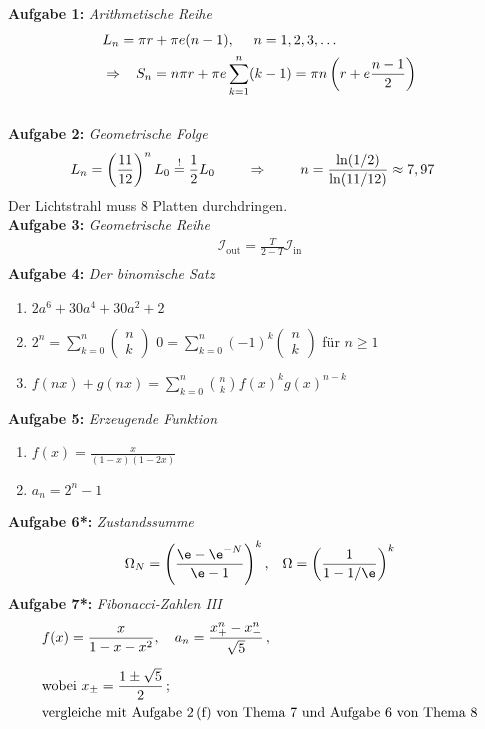 
\textbf{Aufgabe 1: } \emph{Arithmetische Reihe}
\begin{align*}
&L_n=\pi r+\pi e(n-1),\ \ \ \ n=1,2,3,\dots \\
&\Rightarrow\hspace{0.3cm}S_n=n\pi r+\pi e\sum\limits_{k=1}^n(k-1)=\pi n\left(r+e\frac{n-1}{2}\right)
\end{align*}\\[0.5cm]
%
\textbf{Aufgabe 2: } \emph{Geometrische Folge}
\begin{align*}
& L_n=\left(\frac{11}{12}\right)^nL_0\stackrel{!}{=}\frac{1}{2}L_0 \hspace{0.8cm} \Rightarrow\hspace{0.8cm}n=\frac{\ln(1/2)}{\ln(11/12)}\approx 7,97
\end{align*}
Der Lichtstrahl muss 8 Platten durchdringen.\\[1.2cm]
%
\textbf{Aufgabe 3: } \emph{Geometrische Reihe}
\begin{align*}
\mathcal{I}_\text{out}=\frac{T}{2-T}\mathcal{I}_\text{in}\\[0.2cm]
\end{align*}
%
\textbf{Aufgabe 4: } \emph{Der binomische Satz}
\begin{enumerate}[label=(\alph*)]
\item $2a^6+30a^4+30a^2+2$
\item $2^n=\sum\limits_{k=0}^n\begin{pmatrix}n\\k\end{pmatrix}$\hspace{0.2cm}\hspace{0.2cm} $0=\sum\limits_{k=0}^n(-1)^k\begin{pmatrix}n\\k\end{pmatrix}$ für $n\ge 1$
\item $f(nx)+g(nx)=\sum\limits_{k=0}^n\binom{n}{k}f(x)^kg(x)^{n-k}$
\end{enumerate}
\vspace{1cm}
%
\textbf{Aufgabe 5: } \emph{Erzeugende Funktion}
\begin{enumerate}
\item $f(x)=\frac{x}{(1-x)(1-2x)}$
\item $a_n=2^n-1$\\[0.2cm]
\end{enumerate}
%
\textbf{Aufgabe 6*: } \emph{Zustandssumme}
\begin{align*}
\Omega_N=\left(\frac{\e-\e^{-N}}{\e-1}\right)^k, && \Omega=\left(\frac{1}{1-1/\e}\right)^k
\end{align*}
%
\textbf{Aufgabe 7*: } \emph{Fibonacci-Zahlen III}
\begin{align*}
&f(x)=\frac{x}{1-x-x^2},\ \ \ a_n=\frac{x_+^n-x_-^n}{\sqrt{5}}\,,\\[0.2cm]
&\text{wobei } x_{\pm}=\frac{1\pm\sqrt{5}}{2}\,;\\
&\text{vergleiche mit Aufgabe 2\,(f) von Thema 7 und Aufgabe 6 von Thema 8}
\end{align*}